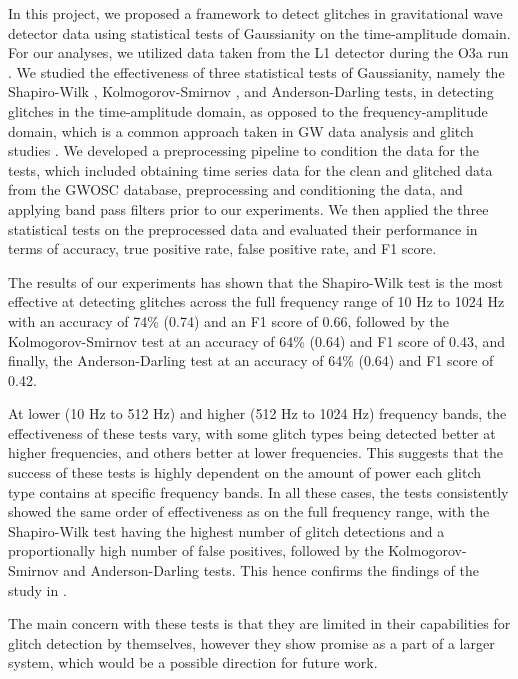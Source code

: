 \documentclass[12pt]{article}
\begin{document}
\noindent In this project, we proposed a framework to detect glitches in gravitational wave detector data using statistical tests of Gaussianity on the time-amplitude domain. For our analyses, we utilized data taken from the L1 detector during the O3a run \cite{abbott_gwtc-2_2021}. We studied the effectiveness of three statistical tests of Gaussianity, namely the Shapiro-Wilk \cite{Shapiro1965}, Kolmogorov-Smirnov \cite{Kolmogorov_1951}, and Anderson-Darling \cite{anderson1954test} tests, in detecting glitches in the time-amplitude domain, as opposed to the frequency-amplitude domain, which is a common approach taken in GW data analysis and glitch studies \cite{chatterji_multiresolution_2004, vazsonyi_identifying_2023}. We developed a preprocessing pipeline to condition the data for the tests, which included obtaining time series data for the clean and glitched data from the GWOSC database, preprocessing and conditioning the data, and applying band pass filters prior to our experiments. We then applied the three statistical tests on the preprocessed data and evaluated their performance in terms of accuracy, true positive rate, false positive rate, and F1 score.

\medskip
\noindent The results of our experiments has shown that the Shapiro-Wilk test is the most effective at detecting glitches across the full frequency range of 10 Hz to 1024 Hz with an accuracy of 74\% (0.74) and an F1 score of 0.66, followed by the Kolmogorov-Smirnov test at an accuracy of 64\% (0.64) and F1 score of 0.43, and finally, the Anderson-Darling test at an accuracy of 64\% (0.64) and F1 score of 0.42.

\medskip
\noindent At lower (10 Hz to 512 Hz) and higher (512 Hz to 1024 Hz) frequency bands, the effectiveness of these tests vary, with some glitch types being detected better at higher frequencies, and others better at lower frequencies. This suggests that the success of these tests is highly dependent on the amount of power each glitch type contains at specific frequency bands. In all these cases, the tests consistently showed the same order of effectiveness as on the full frequency range, with the Shapiro-Wilk test having the highest number of glitch detections and a proportionally high number of false positives, followed by the Kolmogorov-Smirnov and Anderson-Darling tests. This hence confirms the findings of the study in \cite{razali2011power}.

\medskip
\noindent The main concern with these tests is that they are limited in their capabilities for glitch detection by themselves, however they show promise as a part of a larger system, which would be a possible direction for future work.
\end{document}
